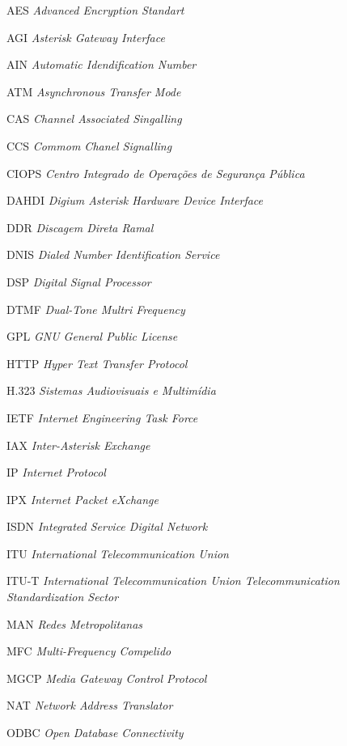 \documentclass[12pt,openright,oneside,a4paper,brazil]{abntex2}
\begin{document}
\begin{siglas}
  \item[AES]	 \textit{Advanced Encryption Standart}
  \item[AGI]	 \textit{Asterisk Gateway Interface}
  \item[AIN]	 \textit{Automatic Idendification Number}
  \item[ATM]	 \textit{Asynchronous Transfer Mode}
  \item[CAS]	 \textit{Channel Associated Singalling}
  \item[CCS]	 \textit{Commom Chanel Signalling}
  \item[CIOPS]   \textit{Centro Integrado de Operações de Segurança Pública}
  \item[DAHDI]	 \textit{Digium Asterisk Hardware Device Interface}
  \item[DDR]	 \textit{Discagem Direta Ramal}
  \item[DNIS]	 \textit{Dialed Number Identification Service}
  \item[DSP]	 \textit{Digital Signal Processor}
  \item[DTMF]	 \textit{Dual-Tone Multri Frequency}
  \item[GPL]	 \textit{GNU General Public License}
  \item[HTTP]	 \textit{Hyper Text Transfer Protocol}
  \item[H.323]   \textit{Sistemas Audiovisuais e Multimídia}
  \item[IETF]	 \textit{Internet Engineering Task Force}
  \item[IAX]	 \textit{Inter-Asterisk Exchange}
  \item[IP]		 \textit{Internet Protocol}
  \item[IPX]	 \textit{Internet Packet eXchange}
  \item[ISDN]	 \textit{Integrated Service Digital Network}
  \item[ITU]	 \textit{International Telecommunication Union}
  \item[ITU-T]	 \textit{International Telecommunication Union Telecommunication Standardization Sector}
  \item[MAN]	 \textit{Redes Metropolitanas}
  \item[MFC]	 \textit{Multi-Frequency Compelido}
  \item[MGCP]	 \textit{Media Gateway Control Protocol}
  \item[NAT]	 \textit{Network Address Translator}
  \item[ODBC]	 \textit{Open Database Connectivity}

\end{siglas}
\end{document}
